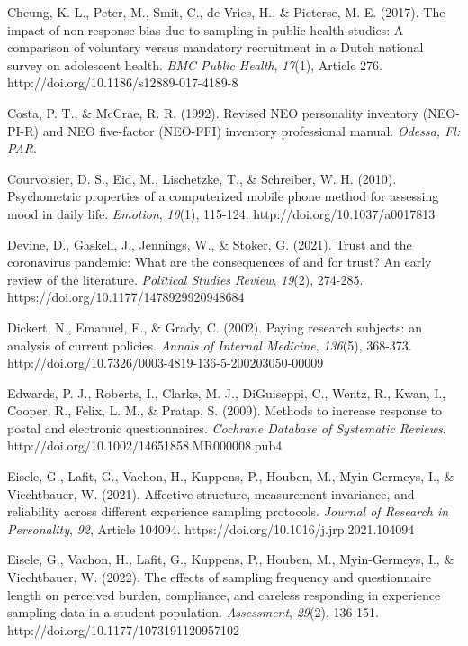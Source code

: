 \documentclass[authordate, empirical]{jote-new-article}
\begin{document}
	Cheung, K. L., Peter, M., Smit, C., de Vries, H., \& Pieterse, M. E. (2017). The impact of non-response bias due to sampling in public health studies: A comparison of voluntary versus mandatory recruitment in a Dutch national survey on adolescent health. \emph{BMC Public Health},\emph{ 17}(1), Article 276. http://doi.org/10.1186/s12889-017-4189-8



	Costa, P. T., \& McCrae, R. R. (1992). Revised NEO personality inventory (NEO-PI-R) and NEO five-factor (NEO-FFI) inventory professional manual. \emph{Odessa, Fl: PAR}.



	Courvoisier, D. S., Eid, M., Lischetzke, T., \& Schreiber, W. H. (2010). Psychometric properties of a computerized mobile phone method for assessing mood in daily life. \emph{Emotion},\emph{ 10}(1), 115-124. http://doi.org/10.1037/a0017813



	Devine, D., Gaskell, J., Jennings, W., \& Stoker, G. (2021). Trust and the coronavirus pandemic: What are the consequences of and for trust? An early review of the literature. \emph{Political Studies Review},\emph{ 19}(2), 274-285. https://doi.org/10.1177/1478929920948684



	Dickert, N., Emanuel, E., \& Grady, C. (2002). Paying research subjects: an analysis of current policies. \emph{Annals of Internal Medicine},\emph{ 136}(5), 368-373. http://doi.org/10.7326/0003-4819-136-5-200203050-00009



	Edwards, P. J., Roberts, I., Clarke, M. J., DiGuiseppi, C., Wentz, R., Kwan, I., Cooper, R., Felix, L. M., \& Pratap, S. (2009). Methods to increase response to postal and electronic questionnaires. \emph{Cochrane Database of Systematic Reviews}. http://doi.org/10.1002/14651858.MR000008.pub4



	Eisele, G., Lafit, G., Vachon, H., Kuppens, P., Houben, M., Myin-Germeys, I., \& Viechtbauer, W. (2021). Affective structure, measurement invariance, and reliability across different experience sampling protocols. \emph{Journal of Research in Personality},\emph{ 92}, Article 104094. https://doi.org/10.1016/j.jrp.2021.104094



	Eisele, G., Vachon, H., Lafit, G., Kuppens, P., Houben, M., Myin-Germeys, I., \& Viechtbauer, W. (2022). The effects of sampling frequency and questionnaire length on perceived burden, compliance, and careless responding in experience sampling data in a student population. \emph{Assessment},\emph{ 29}(2), 136-151. http://doi.org/10.1177/1073191120957102
\end{document}
